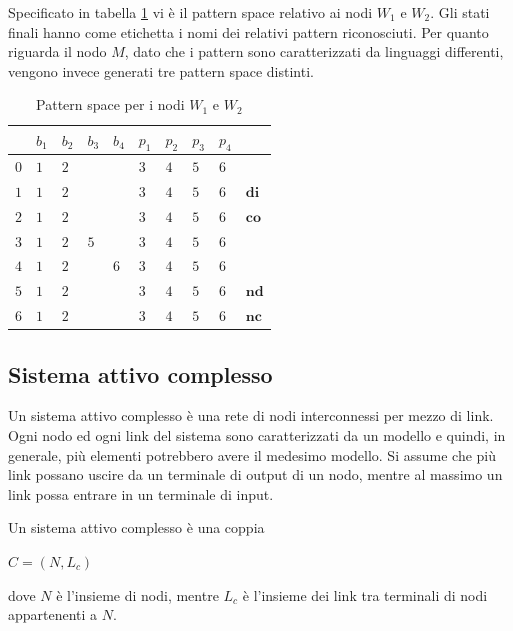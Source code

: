 \begin{ex}
Specificato in tabella \ref{tab:pts_w} vi è il pattern space relativo ai nodi $W_1$ e $W_2$. Gli stati finali hanno come etichetta i nomi dei relativi pattern riconosciuti.
Per quanto riguarda il nodo $M$, dato che i pattern sono caratterizzati da linguaggi differenti, vengono invece generati tre pattern space distinti.
\end{ex}

\begin{table}[htbp] 
\begin{tabularx}{\textwidth}{X | X X X X X X X X | X}
\hline
 & $b_1$ & $b_2$ & $b_3$ & $b_4$ & $p_1$ & $p_2$ & $p_3$ & $p_4$ & \\
\hline
$0$ & $1$ & $2$ &  &  & $3$ & $4$ & $5$ & $6$ & \\
$1$ & $1$ & $2$ &  &  & $3$ & $4$ & $5$ & $6$ & $\textbf{di}$\\
$2$ & $1$ & $2$ &  &  & $3$ & $4$ & $5$ & $6$ & $\textbf{co}$\\
$3$ & $1$ & $2$ & $5$ &  & $3$ & $4$ & $5$ & $6$ & \\
$4$ & $1$ & $2$ &  & $6$ & $3$ & $4$ & $5$ & $6$ & \\
$5$ & $1$ & $2$ &  &  & $3$ & $4$ & $5$ & $6$ & $\textbf{nd}$\\
$6$ & $1$ & $2$ &  &  & $3$ & $4$ & $5$ & $6$ & $\textbf{nc}$\\
\hline
\end{tabularx}
\caption{Pattern space per i nodi $W_1$ e $W_2$}
\label{tab:pts_w}
\end{table}

\subsection{Sistema attivo complesso}
Un sistema attivo complesso è una rete di nodi interconnessi per mezzo di link. Ogni nodo ed ogni link del sistema sono caratterizzati da un modello e quindi, in generale, più elementi potrebbero avere il medesimo modello. Si assume che più link possano uscire da un terminale di output di un nodo, mentre al massimo un link possa entrare in un terminale di input.

\begin{defn}
Un sistema attivo complesso è una coppia
\begin{center}
	$ C = (N,L_c)$
\end{center}
dove $N$ è l'insieme di nodi, mentre $L_c$ è l'insieme dei link tra terminali di nodi appartenenti a $N$.
\end{defn}


